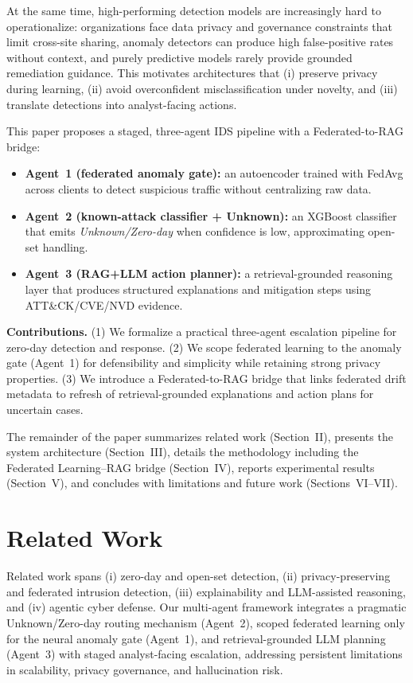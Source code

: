 \documentclass[conference]{IEEEtran}
\begin{document}
At the same time, high-performing detection models are increasingly hard to operationalize: organizations face data privacy and governance constraints that limit cross-site sharing, anomaly detectors can produce high false-positive rates without context, and purely predictive models rarely provide grounded remediation guidance. This motivates architectures that (i) preserve privacy during learning, (ii) avoid overconfident misclassification under novelty, and (iii) translate detections into analyst-facing actions.

This paper proposes a staged, three-agent IDS pipeline with a Federated-to-RAG bridge:
\begin{itemize}
  \item \textbf{Agent~1 (federated anomaly gate):} an autoencoder trained with FedAvg across clients to detect suspicious traffic without centralizing raw data.
  \item \textbf{Agent~2 (known-attack classifier + Unknown):} an XGBoost classifier that emits \emph{Unknown/Zero-day} when confidence is low, approximating open-set handling.
  \item \textbf{Agent~3 (RAG+LLM action planner):} a retrieval-grounded reasoning layer that produces structured explanations and mitigation steps using ATT\&CK/CVE/NVD evidence.
\end{itemize}

\textbf{Contributions.} (1) We formalize a practical three-agent escalation pipeline for zero-day detection and response. (2) We scope federated learning to the anomaly gate (Agent~1) for defensibility and simplicity while retaining strong privacy properties. (3) We introduce a Federated-to-RAG bridge that links federated drift metadata to refresh of retrieval-grounded explanations and action plans for uncertain cases.

The remainder of the paper summarizes related work (Section~II), presents the system architecture (Section~III), details the methodology including the Federated Learning--RAG bridge (Section~IV), reports experimental results (Section~V), and concludes with limitations and future work (Sections~VI--VII).

\section{Related Work}
Related work spans (i) zero-day and open-set detection, (ii) privacy-preserving and federated intrusion detection, (iii) explainability and LLM-assisted reasoning, and (iv) agentic cyber defense. Our multi-agent framework integrates a pragmatic Unknown/Zero-day routing mechanism (Agent~2), scoped federated learning only for the neural anomaly gate (Agent~1), and retrieval-grounded LLM planning (Agent~3) with staged analyst-facing escalation, addressing persistent limitations in scalability, privacy governance, and hallucination risk.
\end{document}
